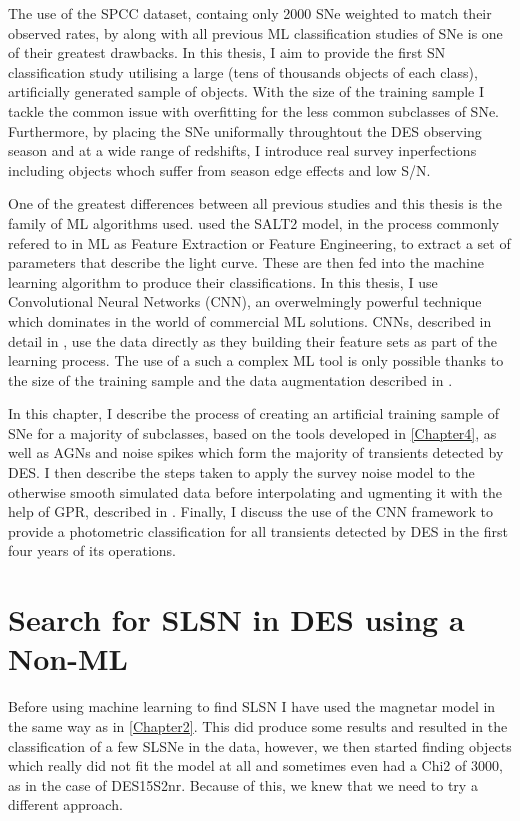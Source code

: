 The use of the SPCC dataset, containg only 2000 SNe weighted to match their observed rates, by \citet{Lochner2016} along with all previous ML classification studies of SNe is one of their greatest drawbacks. In this thesis, I aim to provide the first SN classification study utilising a large (tens of thousands objects of each class), artificially generated sample of objects. With the size of the training sample I tackle the common issue with overfitting for the less common subclasses of SNe. Furthermore, by placing the SNe uniformally throughtout the DES observing season and at a wide range of redshifts, I introduce real survey inperfections including objects whoch suffer from season edge effects and low S/N.

One of the greatest differences between all previous studies and this thesis is the family of ML algorithms used. \citet{Lochner2016} used the SALT2 model, in the process commonly refered to in ML as Feature Extraction or Feature Engineering, to extract a set of parameters that describe the light curve. These are then fed into the machine learning algorithm to produce their classifications. In this thesis, I use Convolutional Neural Networks (CNN), an overwelmingly powerful technique which dominates in the world of commercial ML solutions. CNNs, described in detail in , use the data directly as they building their feature sets as part of the learning process. The use of a such a complex ML tool is only possible thanks to the size of the training sample and the data augmentation described in .

In this chapter, I describe the process of creating an artificial training sample of SNe for a majority of subclasses, based on the tools developed in \cref{Chapter4}, as well as AGNs and noise spikes which form the majority of transients detected by DES. I then describe the steps taken to apply the survey noise model to the otherwise smooth simulated data before interpolating and ugmenting it with the help of GPR, described in . Finally, I discuss the use of the CNN framework to provide a photometric classification for all transients detected by DES in the first four years of its operations.

\section{Search for SLSN in DES using a Non-ML}
Before using machine learning to find SLSN I have used the magnetar model in the same way as in \cref{Chapter2}. This did produce some results and resulted in the classification of a few SLSNe in the data, however, we then started finding objects which really did not fit the model at all and sometimes even had a Chi2 of 3000, as in the case of DES15S2nr. Because of this, we knew that we need to try a different approach.

